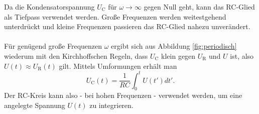Da die Kondensatorspannung $U_{\text{C}}$ für $\omega \to \infty$ gegen Null geht, kann das RC-Glied als Tiefpass verwendet werden. Große Frequenzen werden weitestgehend unterdrückt und kleine Frequenzen passieren das RC-Glied nahezu unverändert. \\
\\Für genügend große Frequenzen  $\omega$ ergibt sich aus Abbildung \ref{fig:periodisch} wiederum mit den Kirchhoffschen Regeln, dass $U_\text{C}$ klein gegen $U_{\text{R}}$ und $U$ ist, also $U(t) \approx U_\text{R}(t)$ gilt.
Mittels Umformungen erhält man
\begin{equation}
	U_\text{C}(t)=\frac{1}{RC} \int_{0}^{t} U(t') dt' \text{.}
\end{equation}
Der RC-Kreis kann also - bei hohen Frequenzen - verwendet werden,  um eine angelegte Spannung $U(t)$ zu integrieren.
